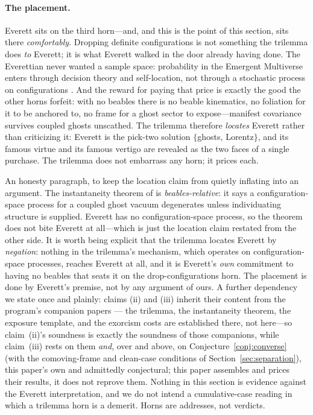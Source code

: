 \documentclass[11pt]{article}
\theoremstyle{remark}
\begin{document}
\paragraph{The placement.} Everett sits on the third horn---and, and
this is the point of this section, sits there \emph{comfortably}.
Dropping definite configurations is not something the trilemma does
\emph{to} Everett; it is what Everett walked in the door already
having done. The Everettian never wanted a sample space: probability
in the Emergent Multiverse enters through decision theory and
self-location, not through a stochastic process on configurations
\cite{Wallace2012}. And the reward for paying that price is exactly
the good the other horns forfeit: with no beables there is no beable
kinematics, no foliation for it to be anchored to, no frame for a
ghost sector to expose---manifest covariance survives coupled ghosts
unscathed. The trilemma therefore \emph{locates} Everett rather than
criticizing it: Everett is the pick-two solution
$\{$ghosts, Lorentz$\}$, and its famous virtue and its famous
vertigo are revealed as the two faces of a single purchase. The
trilemma does not embarrass any horn; it prices each.

An honesty paragraph, to keep the location claim from quietly
inflating into an argument. The instantaneity theorem of
\cite{instantaneous} is \emph{beables-relative}: it says a
configuration-space process for a coupled ghost vacuum degenerates
unless individuating structure is supplied. Everett has no
configuration-space process, so the theorem does not bite Everett at
all---which is just the location claim restated from the other side.
It is worth being explicit that the trilemma locates Everett by
\emph{negation}: nothing in the trilemma's mechanism, which operates on
configuration-space processes, reaches Everett at all, and it is
Everett's \emph{own} commitment to having no beables that seats it on
the drop-configurations horn. The placement is done by Everett's
premise, not by any argument of ours. A further dependency we state
once and plainly: claims (ii) and (iii) inherit their content from the
program's companion papers \cite{instantaneous,choosing,exorcised}---%
the trilemma, the instantaneity theorem, the exposure template, and the
exorcism costs are established there, not here---so claim~(ii)'s
soundness is exactly the soundness of those companions, while
claim~(iii) rests on them \emph{and}, over and above, on
Conjecture~\ref{conj:converse} (with the comoving-frame and clean-case
conditions of Section~\ref{sec:separation}), this paper's own and
admittedly conjectural; this paper assembles and prices their results,
it does not reprove them. Nothing in this section
is evidence against the Everett interpretation, and we do not intend a
cumulative-case reading in which a trilemma horn is a demerit. Horns
are addresses, not verdicts.
\end{document}
